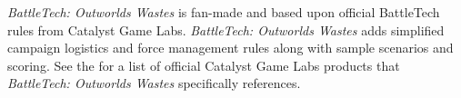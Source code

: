 \emph{BattleTech: Outworlds Wastes} is fan-made and based upon official BattleTech rules from Catalyst Game Labs.
\emph{BattleTech: Outworlds Wastes} adds simplified campaign logistics and force management rules along with sample scenarios and scoring.
See the  for a list of official Catalyst Game Labs products that \emph{BattleTech: Outworlds Wastes} specifically references.
